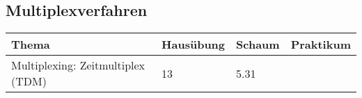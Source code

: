 \subsection{Multiplexverfahren}
	\begin{tabular}{|p{9cm}|p{2.5cm}|p{3.5cm}|p{2cm}|}
	\hline
	\textbf{Thema} & \textbf{Hausübung} & \textbf{Schaum} & \textbf{Praktikum} \\ \hline
	Multiplexing: Zeitmultiplex (TDM) & 13 & 5.31 &  \\ \hline
	\end{tabular}




